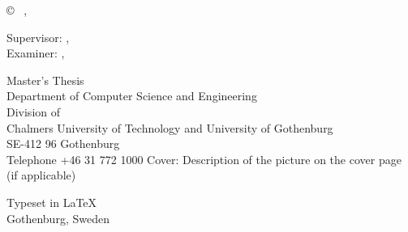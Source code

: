 \vspace{1cm}

\copyright ~ \authorfirstname{} \authorlastname{}, \the\year

\vspace{1em}

Supervisor: \supervisorfirstname{} \supervisorlastname{}, \supervisordepartment{}\\
Examiner: \examinerfirstname{} \examinerlastname{}, \examinerdepartment{}

\vspace{1em}

Master's Thesis \the\year\\
Department of Computer Science and Engineering\\
Division of \division{}\\
Chalmers University of Technology and University of Gothenburg\\
SE-412 96 Gothenburg\\
Telephone +46 31 772 1000
\vspace{0.5cm}
\vfill
Cover: Description of the picture on the cover page (if applicable)

Typeset in \LaTeX \\
Gothenburg, Sweden \the\year

\setlength{\parindent}{1.5em}
